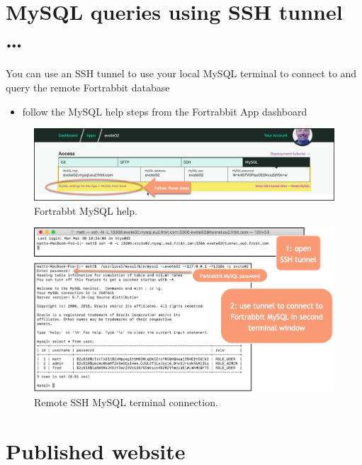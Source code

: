 \documentclass[a4paperpaper,openright]{book}
\providecommand{\tightlist}{%
  \setlength{\itemsep}{0pt}\setlength{\parskip}{0pt}}
\begin{document}
\hypertarget{mysql-queries-using-ssh-tunnel}{%
\section{MySQL queries using SSH tunnel
\ldots{}}\label{mysql-queries-using-ssh-tunnel}}

You can use an SSH tunnel to use your local MySQL terminal to connect to
and query the remote Fortrabbit database

\begin{itemize}
\tightlist
\item
  follow the MySQL help steps from the Fortrabbit App dashboard
\end{itemize}

\begin{figure}
\centering
\includegraphics{./tex2pdf.-05a85d9d563be472/a165c9dd7a746479c0c71da7102bdb2b6f5748ea.png}
\caption{Fortrabbt MySQL help.}
\end{figure}

\begin{figure}
\centering
\includegraphics{./tex2pdf.-05a85d9d563be472/4a831ca76089eb2616508f4c80b41db0ca4d5969.png}
\caption{Remote SSH MySQL terminal connection.}
\end{figure}

\hypertarget{published-website}{%
\section{Published website}\label{published-website}}
\end{document}
